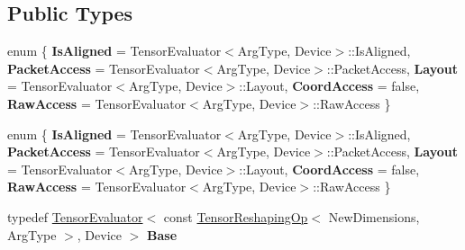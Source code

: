 \subsection*{Public Types}
\begin{DoxyCompactItemize}
\item 
\mbox{\label{struct_eigen_1_1_tensor_evaluator_3_01_tensor_reshaping_op_3_01_new_dimensions_00_01_arg_type_01_4_00_01_device_01_4_a6fd39ff0f07df0a19ad7bd2c00695bf8}} 
enum \{ \newline
{\bfseries Is\+Aligned} = Tensor\+Evaluator$<$Arg\+Type, Device$>$\+:\+:Is\+Aligned, 
{\bfseries Packet\+Access} = Tensor\+Evaluator$<$Arg\+Type, Device$>$\+:\+:Packet\+Access, 
{\bfseries Layout} = Tensor\+Evaluator$<$Arg\+Type, Device$>$\+:\+:Layout, 
{\bfseries Coord\+Access} = false, 
\newline
{\bfseries Raw\+Access} = Tensor\+Evaluator$<$Arg\+Type, Device$>$\+:\+:Raw\+Access
 \}
\item 
\mbox{\label{struct_eigen_1_1_tensor_evaluator_3_01_tensor_reshaping_op_3_01_new_dimensions_00_01_arg_type_01_4_00_01_device_01_4_ae011e3d0874691a39818af5bbdf1fc77}} 
enum \{ \newline
{\bfseries Is\+Aligned} = Tensor\+Evaluator$<$Arg\+Type, Device$>$\+:\+:Is\+Aligned, 
{\bfseries Packet\+Access} = Tensor\+Evaluator$<$Arg\+Type, Device$>$\+:\+:Packet\+Access, 
{\bfseries Layout} = Tensor\+Evaluator$<$Arg\+Type, Device$>$\+:\+:Layout, 
{\bfseries Coord\+Access} = false, 
\newline
{\bfseries Raw\+Access} = Tensor\+Evaluator$<$Arg\+Type, Device$>$\+:\+:Raw\+Access
 \}
\item 
\mbox{\label{struct_eigen_1_1_tensor_evaluator_3_01_tensor_reshaping_op_3_01_new_dimensions_00_01_arg_type_01_4_00_01_device_01_4_a47d801d64a7e1b08676a9effdfcfdb08}} 
typedef \hyperlink{struct_eigen_1_1_tensor_evaluator}{Tensor\+Evaluator}$<$ const \hyperlink{class_eigen_1_1_tensor_reshaping_op}{Tensor\+Reshaping\+Op}$<$ New\+Dimensions, Arg\+Type $>$, Device $>$ {\bfseries Base}
\item 

\end{DoxyCompactItemize}
